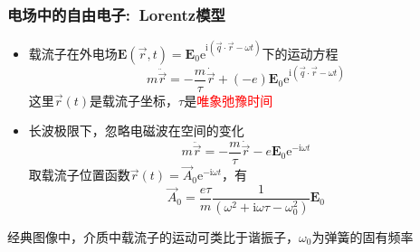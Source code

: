 \frame
{
	\frametitle{电场中的自由电子:~\textrm{Lorentz}模型}
	\begin{itemize}
		\item 载流子在外电场$\mathbf{E}(\vec r,t)=\mathbf{E}_0\mathrm{e}^{\mathrm{i}(\vec q\cdot\vec r-\omega t)}$下的运动方程
			\begin{displaymath}
				m\ddot{\vec r}=-\frac m{\tau}\dot{\vec r}+(-e)\mathbf{E}_0\mathrm{e}^{\mathrm{i}(\vec q\cdot\vec r-\omega t)}
			\end{displaymath}
			这里$\vec r(t)$是载流子坐标，$\tau$是\textcolor{red}{唯象弛豫时间}
		\item 长波极限下，忽略电磁波在空间的变化
			\begin{displaymath}
				m\ddot{\vec r}=-\frac m{\tau}\dot{\vec r}-e\mathbf{E}_0\mathrm{e}^{-\mathrm{i}\omega t}
			\end{displaymath}
			取载流子位置函数$\vec r(t)=\vec A_0\mathrm{e}^{-\mathrm{i}\omega t}$，有
			\begin{displaymath}
				\vec A_0=\frac{e\tau}m\frac1{(\omega^2+\mathrm{i}\omega\tau-\omega_0^2)}\mathbf{E}_0
			\end{displaymath}
	\end{itemize}
	经典图像中，介质中载流子的运动可类比于谐振子，$\omega_0$为弹簧的固有频率
}

